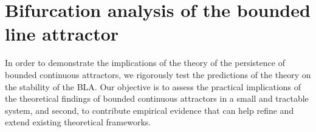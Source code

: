 \documentclass{article} %
\newcounter{ct}
\theoremstyle{definition}
\theoremstyle{remark}
\begin{document}
%


%

\section{Bifurcation analysis of the bounded line attractor}\label{sec:supp:bla}

In order to demonstrate the implications of the theory of the persistence of bounded continuous attractors, we rigorously test the predictions of the theory on the stability of the BLA.
 Our objective is to assess the practical implications of the theoretical findings of bounded continuous attractors in a small and tractable system, and second, to contribute empirical evidence that can help refine and extend existing theoretical frameworks. 
\end{document}
